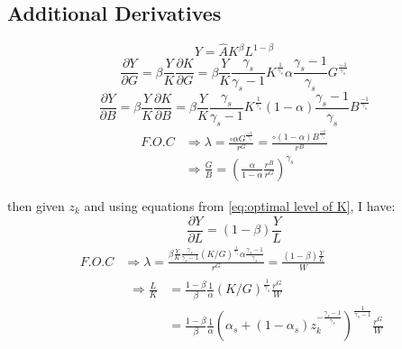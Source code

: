 \documentclass[12pt]{article} %
\begin{document}
\subsection*{Additional Derivatives}
\begin{equation*}
    Y = \hat{A} K^{\beta} L^{1-\beta}
\end{equation*}
\begin{equation*}
    \frac{\partial Y}{\partial G}   = \beta\frac{Y}{K} \frac{\partial K}{\partial G} = \beta\frac{Y}{K} \frac{\gamma_s}{\gamma_s-1} K ^{\frac{1}{\gamma_s}}\alpha \frac{\gamma_s-1}{\gamma_s}G^{\frac{-1}{\gamma_s}}
\end{equation*}
\begin{equation*}
    \frac{\partial Y}{\partial B} = \beta\frac{Y}{K} \frac{\partial K}{\partial B} = \beta\frac{Y}{K} \frac{\gamma_s}{\gamma_s-1} K ^{\frac{1}{\gamma_s}}(1-\alpha) \frac{\gamma_s-1}{\gamma_s}B^{\frac{-1}{\gamma_s}}
\end{equation*}
\begin{equation*}
    \begin{split}
        F.O.C &\Rightarrow \lambda = \frac{\circ \alpha G^{\frac{-1}{\gamma_s} }}{r^G} = \frac{\circ (1-\alpha) B^{\frac{-1}{\gamma_s} }}{r^B}\\
        & \Rightarrow \frac{G}{B} = \left(\frac{\alpha}{1-\alpha}\frac{r^B}{r^G}\right)^{\gamma_s}
    \end{split}
\end{equation*}

then given $z_k$ and using equations from \ref{eq:optimal level of K}, I have:
\begin{equation*}
    \frac{\partial Y}{\partial L} = (1-\beta)\frac{Y}{L} 
\end{equation*}
\begin{equation*}
    \begin{split}
        F.O.C &\Rightarrow \lambda = \frac{\beta\frac{Y}{K} \frac{\gamma_s}{\gamma_s-1} (K/G) ^{\frac{1}{\gamma_s}}\alpha \frac{\gamma_s-1}{\gamma_s}}{r^G} = \frac{(1-\beta)\frac{Y}{L}}{W}\\
        &  \begin{split}
            \Rightarrow\frac{L}{K} & = \frac{1-\beta}{\beta} \frac{1}{\alpha} (K/G) ^{\frac{1}{\gamma_s}} \frac{r^G}{W}\\
            & =  \frac{1-\beta}{\beta} \frac{1}{\alpha}(\alpha_s + (1-\alpha_s) z_k^{-\frac{\gamma_s-1}{\gamma_s}})^{\frac{1}{\gamma_s-1}} \frac{r^G}{W}
        \end{split}
    \end{split}
\end{equation*}
\end{document}
